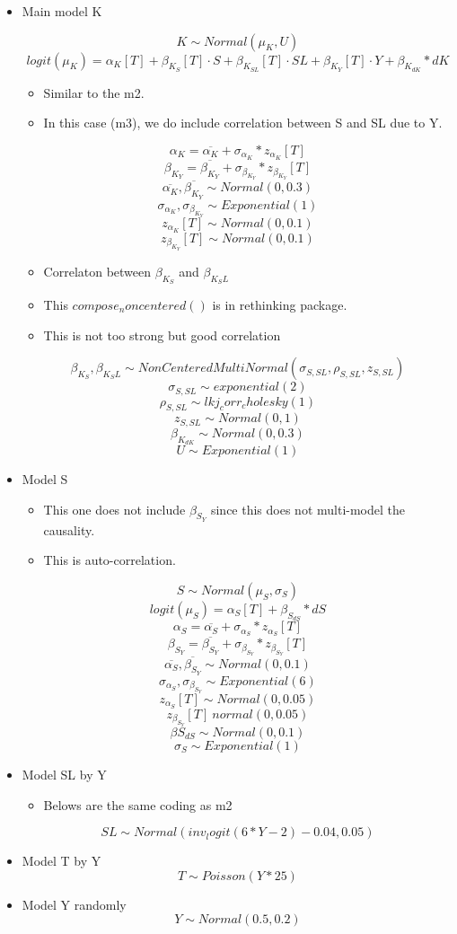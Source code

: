 \documentclass{article}
\begin{document}
\begin{itemize}
 \item Main model K

$$K \sim Normal(\mu_K, U) $$
$$logit(\mu_K) = \alpha _{K}[T] + \beta _{K_S}[T] \cdot S + \beta _{K_{SL}}[T] \cdot SL + \beta _{K_{Y}}[T] \cdot Y + \beta _{K_{dK}} * dK$$
\begin{itemize}
    \item Similar to the m2. 
    \item In this case (m3), we do include correlation between S and SL due to Y. 
\end{itemize}
$$\alpha _K = \overline{\alpha _K} + \sigma_{\alpha _K} * z_{\alpha _K}[T] $$
$$\beta _{K_Y } = \overline{\beta _{K _Y}} + \sigma_{\beta _{K _Y}} * z_{\beta _{K_Y}}[T] $$
$$\overline{\alpha _K}, \overline{\beta _{K _Y}} \sim Normal(0,0.3)$$
$$\sigma_{\alpha _K}, \sigma_{\beta _{K _Y}} \sim Exponential(1)$$
$$z_{\alpha _K}[T] \sim Normal(0,0.1)$$
$$z_{\beta _{K_Y}}[T] \sim Normal(0,0.1)$$
\begin{itemize}
    \item Correlaton between $\beta _{K_S}$ and $\beta _{K_SL}$
    \item This $compose_noncentered()$ is in rethinking package. 
    \item This is not too strong but good correlation
\end{itemize}
$$\beta _{K_S}, \beta _{K_SL} \sim NonCenteredMultiNormal(\sigma_{S, SL}, \rho _{S, SL}, z_{S, SL})$$
$$\sigma_{S, SL} \sim exponential(2)$$
$$ \rho _{S, SL} \sim lkj_corr_cholesky(1) $$
$$z_{S, SL} \sim Normal(0, 1) $$
$$\beta _{K_{dK}} \sim Normal(0, 0.3)$$
$$U \sim Exponential(1)$$

\item Model S 
\begin{itemize}
    \item This one does not include $\beta_{S_Y}$ since this does not multi-model the causality. 
    \item This is auto-correlation. 
\end{itemize}

$$S \sim Normal(\mu_S, \sigma_S)$$
$$logit(\mu_S) = \alpha _S [T] + \beta _ {S_{dS}} * dS$$
$$\alpha_S = \overline{\alpha _S} + \sigma_{\alpha _S} * z_{\alpha _S}[T]$$
$$\beta _{S_Y} = \overline{\beta _{S_Y}} + \sigma _{\beta _{S_Y}} * z _ {\beta _{S_Y}}[T]$$
$$\overline{\alpha _S}, \overline{\beta _{S_Y}} \sim Normal(0,0.1)$$
$$\sigma_{\alpha _S}, \sigma _{\beta _{S_Y}} \sim Exponential(6)$$
$$z_{\alpha _S}[T] \sim Normal(0,0.05)$$
$$z _{\beta _{S_Y}}[T] ~ normal(0,0.05)$$
$$\beta {S_{dS}} \sim Normal(0,0.1)$$
$$\sigma_S \sim Exponential(1)$$

\item Model SL by Y 
\begin{itemize}
    \item Belows are the same coding as m2
\end{itemize}
$$SL \sim Normal(inv_logit(6 * Y - 2) - 0.04, 0.05)$$

\item Model T by Y  
$$T \sim Poisson(Y * 25)$$

\item Model Y randomly
$$Y \sim Normal(0.5, 0.2)$$

\end{itemize}
\end{document}
